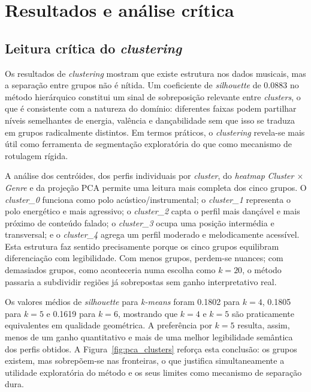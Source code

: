 \documentclass[11pt,a4paper]{article}
\begin{document}
\section{Resultados e análise crítica}
\label{sec:analise_critica}

\subsection{Leitura crítica do \textit{clustering}}

Os resultados de \textit{clustering} mostram que existe estrutura nos dados musicais, mas a separação entre grupos não é nítida. Um coeficiente de \textit{silhouette} de 0.0883 no método hierárquico constitui um sinal de sobreposição relevante entre \textit{clusters}, o que é consistente com a natureza do domínio: diferentes faixas podem partilhar níveis semelhantes de energia, valência e dançabilidade sem que isso se traduza em grupos radicalmente distintos. Em termos práticos, o \textit{clustering} revela-se mais útil como ferramenta de segmentação exploratória do que como mecanismo de rotulagem rígida.

A análise dos centróides, dos perfis individuais por \textit{cluster}, do \textit{heatmap} \textit{Cluster $\times$ Genre} e da projeção PCA permite uma leitura mais completa dos cinco grupos. O \textit{cluster\_0} funciona como polo acústico/instrumental; o \textit{cluster\_1} representa o polo energético e mais agressivo; o \textit{cluster\_2} capta o perfil mais dançável e mais próximo de conteúdo falado; o \textit{cluster\_3} ocupa uma posição intermédia e transversal; e o \textit{cluster\_4} agrega um perfil moderado e melodicamente acessível. Esta estrutura faz sentido precisamente porque os cinco grupos equilibram diferenciação com legibilidade. Com menos grupos, perdem-se nuances; com demasiados grupos, como aconteceria numa escolha como $k=20$, o método passaria a subdividir regiões já sobrepostas sem ganho interpretativo real.

Os valores médios de \textit{silhouette} para \textit{k-means} foram 0.1802 para $k=4$, 0.1805 para $k=5$ e 0.1619 para $k=6$, mostrando que $k=4$ e $k=5$ são praticamente equivalentes em qualidade geométrica. A preferência por $k=5$ resulta, assim, menos de um ganho quantitativo e mais de uma melhor legibilidade semântica dos perfis obtidos. A Figura~\ref{fig:pca_clusters} reforça esta conclusão: os grupos existem, mas sobrepõem-se nas fronteiras, o que justifica simultaneamente a utilidade exploratória do método e os seus limites como mecanismo de separação dura.
\end{document}
